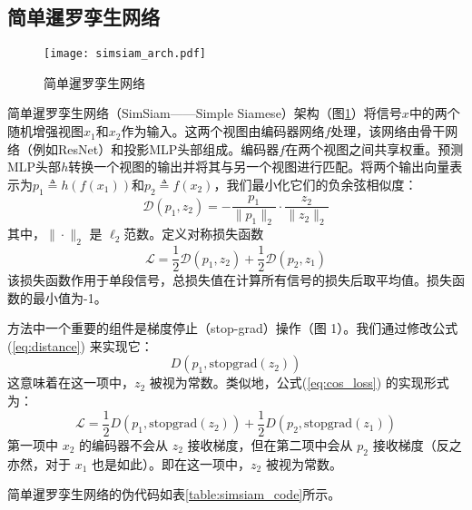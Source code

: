 \documentclass[master]{thesis-uestc}
\begin{document}
\subsection{简单暹罗孪生网络}
\begin{figure}[h]
    \texttt{[image: simsiam\_arch.pdf]}
    \caption{简单暹罗孪生网络}
    \label{simsiam_arch}
\end{figure}
简单暹罗孪生网络（SimSiam——Simple Siamese）架构（图\ref{simsiam_arch}）将信号$x$中的两个随机增强视图$x_1$和$x_2$作为输入。这两个视图由编码器网络$f$处理，该网络由骨干网络（例如ResNet）和投影MLP头部组成。编码器$f$在两个视图之间共享权重。预测MLP头部$h$转换一个视图的输出并将其与另一个视图进行匹配。将两个输出向量表示为$p_1 \triangleq h(f(x_1))$和$p_2 \triangleq f(x_2)$，我们最小化它们的负余弦相似度：
\begin{equation}
    \mathcal{D}(p_1, z_2) = -\frac{p_1}{\|p_1\|_2} \cdot \frac{z_2}{\|z_2\|_2}
    \label{eq:distance}
\end{equation}  
其中，$\|\cdot\|_2$ 是 $\ell_2$范数。定义对称损失函数
\begin{equation}
    \mathcal{L} = \frac{1}{2} \mathcal{D}(p_{1}, z_{2}) + \frac{1}{2} \mathcal{D}(p_{2}, z_{1})
\label{eq:cos_loss}
\end{equation}
该损失函数作用于单段信号，总损失值在计算所有信号的损失后取平均值。损失函数的最小值为-1。

方法中一个重要的组件是梯度停止（stop-grad）操作（图 1）。我们通过修改公式(\ref{eq:distance}) 来实现它：
\begin{equation}
    D(p_1, \text{stopgrad}(z_2))
\label{eq:stopgrad}
\end{equation}
这意味着在这一项中，\( z_2 \) 被视为常数。类似地，公式(\ref{eq:cos_loss}) 的实现形式为：
\begin{equation}
\mathcal{L} = \frac{1}{2} D(p_1, \text{stopgrad}(z_2)) + \frac{1}{2} D(p_2, \text{stopgrad}(z_1))
\label{eq:cos_loss_stopgrad}
\end{equation}
第一项中 \( x_2 \) 的编码器不会从 \( z_2 \) 接收梯度，但在第二项中会从 \( p_2 \) 接收梯度（反之亦然，对于 \( x_1 \) 也是如此）。即在这一项中，\( z_2 \) 被视为常数。

简单暹罗孪生网络的伪代码如表\ref{table:simsiam_code}所示。
\end{document}
